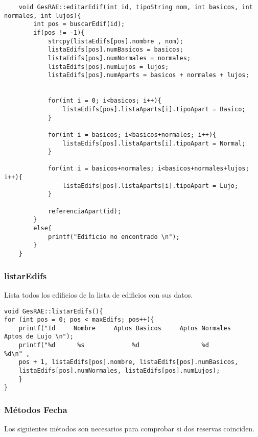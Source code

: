 \documentclass[12pt]{article}
\begin{document}
	\begin{lstlisting}
	void GesRAE::editarEdif(int id, tipoString nom, int basicos, int normales, int lujos){
		int pos = buscarEdif(id);
		if(pos != -1){
			strcpy(listaEdifs[pos].nombre , nom);
			listaEdifs[pos].numBasicos = basicos;
			listaEdifs[pos].numNormales = normales;
			listaEdifs[pos].numLujos = lujos;
			listaEdifs[pos].numAparts = basicos + normales + lujos;
			
			
			for(int i = 0; i<basicos; i++){
				listaEdifs[pos].listaAparts[i].tipoApart = Basico;
			}
			
			for(int i = basicos; i<basicos+normales; i++){
				listaEdifs[pos].listaAparts[i].tipoApart = Normal;
			}
			
			for(int i = basicos+normales; i<basicos+normales+lujos; i++){
				listaEdifs[pos].listaAparts[i].tipoApart = Lujo;
			}
			
			referenciaApart(id);
		}
		else{
			printf("Edificio no encontrado \n");
		}
	}
	\end{lstlisting}
	
	\subsubsection{listarEdifs}
	
	Lista todos los edificios de la lista de edificios con sus datos.
	\small
	\begin{lstlisting}
void GesRAE::listarEdifs(){
for (int pos = 0; pos < maxEdifs; pos++){
	printf("Id     Nombre     Aptos Basicos     Aptos Normales     Aptos de Lujo \n");
	printf("%d      %s             %d                 %d                 %d\n" ,
	pos + 1, listaEdifs[pos].nombre, listaEdifs[pos].numBasicos, 
	listaEdifs[pos].numNormales, listaEdifs[pos].numLujos);
	}
}

	\end{lstlisting}
	
	\subsubsection{Métodos Fecha}
	
	Los siguientes métodos son necesarios para comprobar si dos reservas coinciden.
	
\end{document}
